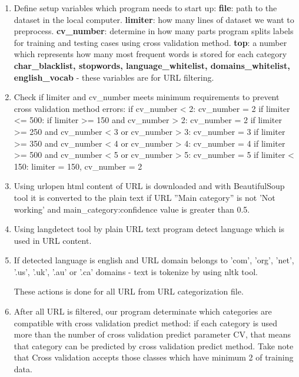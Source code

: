 \documentclass{article} %
\begin{document}
 \begin{enumerate}
 	\item Define setup variables which program needs to start up:
 	\subitem \textbf{file}: path to the dataset in the local computer.
 	\subitem \textbf{limiter}: how many lines of dataset we want to preprocess.
 	\subitem \textbf{cv\_number}: determine in how many parts program splits labels for training and testing cases using cross validation method.
 	\subitem \textbf{top}: a number which represents how many most frequent words is stored for each category
 	\subitem  \textbf{char\_blacklist, stopwords, language\_whitelist, domains\_whitelist, english\_vocab} - these variables are for URL filtering.
 	\item Check if limiter and cv\_number meets minimum requirements to prevent cross validation method errors:
 	\subitem if cv\_number \textless{} 2: cv\_number = 2
 	\subitem if limiter \textless{}= 500:
 		\subsubitem  if limiter \textgreater{}= 150 and cv\_number \textgreater{} 2: cv\_number = 2
 		\subsubitem  if limiter \textgreater{}= 250 and cv\_number \textless{} 3 or cv\_number \textgreater{} 3:  cv\_number = 3
 		\subitem if limiter \textgreater{}= 350 and cv\_number \textless{} 4 or cv\_number \textgreater{} 4: cv\_number = 4
 		\subitem if limiter \textgreater{}= 500 and cv\_number \textless{} 5 or cv\_number \textgreater{} 5: cv\_number = 5
 		\subsubitem  if limiter \textless{} 150: limiter = 150, cv\_number = 2
	\item Using urlopen \cite{url_open} html content of URL is downloaded and with BeautifulSoup tool it is converted to the plain text if URL ''Main category'' is not 'Not working' and main\_category:confidence value is greater than 0.5.
 	\item Using langdetect tool by plain URL text program detect language which is used in URL content.
 	\item If detected language is english and URL domain belongs to 'com', 'org', 'net', '.us', '.uk', '.au' or '.ca' domains - text is tokenize by using nltk tool. 
 	
 	These actions is done for all URL from URL categorization file.
 	
 	\item After all URL is filtered, our program determinate which categories are compatible with cross validation predict method: if each category is used more than the number of cross validation predict parameter CV, that means that category can be predicted by cross validation predict method. Take note that Cross validation accepts those classes which have minimum 2 of training data.
 	

\end{enumerate}
\end{document}
